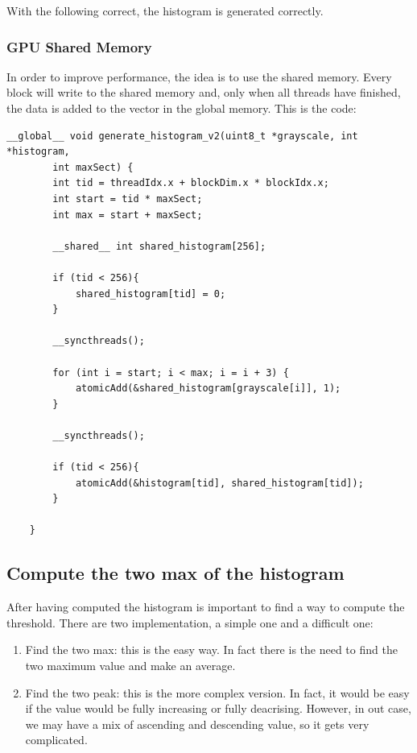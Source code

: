 \documentclass[paper=a4, fontsize=10pt]{scrartcl}	%
\begin{document}
	With the following correct, the histogram is generated correctly.

	\subsubsection{GPU Shared Memory}

	In order to improve performance, the idea is to use the shared memory. Every block will write to the shared memory and, only when all threads have finished, the data is added to the vector in the global memory. This is the code:

	\begin{lstlisting}[style=CStyle]
	__global__ void generate_histogram_v2(uint8_t *grayscale, int *histogram,
		int maxSect) {
		int tid = threadIdx.x + blockDim.x * blockIdx.x;
		int start = tid * maxSect;
		int max = start + maxSect;
	
		__shared__ int shared_histogram[256];
		
		if (tid < 256){
			shared_histogram[tid] = 0;
		}
	
		__syncthreads();
	
		for (int i = start; i < max; i = i + 3) {
			atomicAdd(&shared_histogram[grayscale[i]], 1);
		}
	
		__syncthreads();
	
		if (tid < 256){
			atomicAdd(&histogram[tid], shared_histogram[tid]);
		}
	
	}
	\end{lstlisting}


	\subsection{Compute the two max of the histogram}

	After having computed the histogram is important to find a way to compute the threshold. There are two implementation, a simple one and a difficult one:

	\begin{enumerate}
		\item Find the two max: this is the easy way. In fact there is the need to find the two maximum value and make an average.
		\item Find the two peak: this is the more complex version. In fact, it would be easy if the value would be fully increasing or fully deacrising. However, in out case, we may have a mix of ascending and descending value, so it gets very complicated.
	\end{enumerate}
\end{document}
